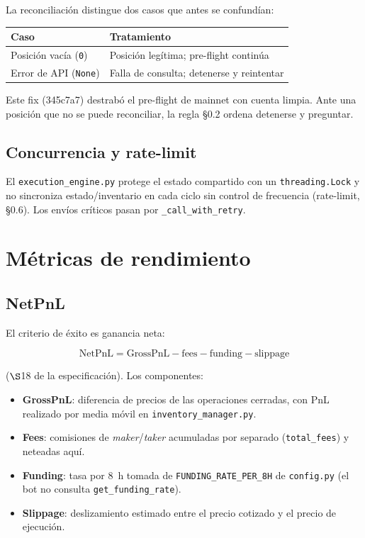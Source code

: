 \documentclass[11pt,a4paper]{article}
\newcommand{\codigo}[1]{\texttt{#1}}
\begin{document}
La reconciliación distingue dos casos que antes se confundían:

\begin{center}
\begin{tabular}{ll}
\toprule
\textbf{Caso} & \textbf{Tratamiento} \\
\midrule
Posición vacía (\codigo{0}) & Posición legítima; pre-flight continúa \\
Error de API (\codigo{None}) & Falla de consulta; detenerse y reintentar \\
\bottomrule
\end{tabular}
\end{center}

Este fix (345c7a7) destrabó el pre-flight de mainnet con cuenta limpia.
Ante una posición que no se puede reconciliar, la regla §0.2 ordena
detenerse y preguntar.

\subsection{Concurrencia y rate-limit}
El \codigo{execution\_engine.py} protege el estado compartido con un
\codigo{threading.Lock} y no sincroniza estado/inventario en cada ciclo
sin control de frecuencia (rate-limit, §0.6). Los envíos críticos pasan
por \codigo{\_call\_with\_retry}.

\section{Métricas de rendimiento}

\subsection{NetPnL}
El criterio de éxito es ganancia neta:

\begin{equation}
  \text{NetPnL} = \text{GrossPnL} - \text{fees} - \text{funding} - \text{slippage}
\end{equation}

($\S$18 de la especificación). Los componentes:
\begin{itemize}
  \item \textbf{GrossPnL}: diferencia de precios de las operaciones
  cerradas, con PnL realizado por media móvil en
  \codigo{inventory\_manager.py}.
  \item \textbf{Fees}: comisiones de \emph{maker}/\emph{taker}
  acumuladas por separado (\codigo{total\_fees}) y neteadas aquí.
  \item \textbf{Funding}: tasa por 8~h tomada de
  \codigo{FUNDING\_RATE\_PER\_8H} de \codigo{config.py} (el bot no
  consulta \codigo{get\_funding\_rate}).
  \item \textbf{Slippage}: deslizamiento estimado entre el precio
  cotizado y el precio de ejecución.
\end{itemize}
\end{document}
